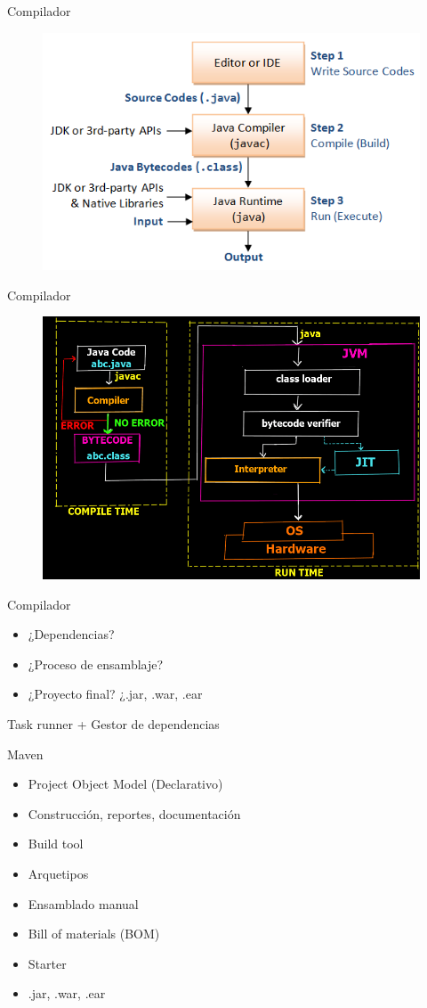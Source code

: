 \documentclass[aspectratio=169]{beamer}
\begin{document}
\begin{frame}{Compilador}
\begin{figure}
	\centering
	\includegraphics[width=0.8\linewidth]{Images/javac2}
\end{figure}
\end{frame}


\begin{frame}{Compilador}
\begin{figure}
	\centering
	\includegraphics[width=0.7\linewidth]{Images/javac1}
\end{figure}
\end{frame}


\begin{frame}{Compilador}
\begin{itemize}
	\item ¿Dependencias?
	\item ¿Proceso de ensamblaje?
	\item ¿Proyecto final? ¿.jar, .war, .ear
\end{itemize}
\pause
Task runner + Gestor de dependencias
\end{frame}

\begin{frame}{Maven}
\begin{itemize}
	\item Project Object Model (Declarativo)
	\item Construcción, reportes, documentación
	\item Build tool
	\item Arquetipos
	\item Ensamblado manual
	\item Bill of materials (BOM)
	\item Starter
	\item .jar, .war, .ear
\end{itemize}
\end{frame}
\end{document}
